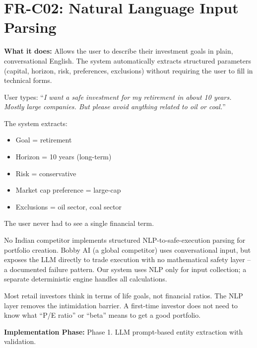 \documentclass[12pt, a4paper, openany, oneside]{report}
\begin{document}
\section{FR-C02: Natural Language Input Parsing}

\textbf{What it does:} Allows the user to describe their investment goals in plain, conversational English. The system automatically extracts structured parameters (capital, horizon, risk, preferences, exclusions) without requiring the user to fill in technical forms.

\begin{examplebox}
User types: ``\textit{I want a safe investment for my retirement in about 10 years. Mostly large companies. But please avoid anything related to oil or coal.}''

The system extracts:
\begin{itemize}[noitemsep]
  \item Goal = retirement
  \item Horizon = 10 years (long-term)
  \item Risk = conservative
  \item Market cap preference = large-cap
  \item Exclusions = oil sector, coal sector
\end{itemize}
The user never had to see a single financial term.
\end{examplebox}

\begin{gapbox}
No Indian competitor implements structured NLP-to-safe-execution parsing for portfolio creation. Bobby AI (a global competitor) uses conversational input, but exposes the LLM directly to trade execution with no mathematical safety layer -- a documented failure pattern. Our system uses NLP only for input collection; a separate deterministic engine handles all calculations.
\end{gapbox}

\begin{valuebox}
Most retail investors think in terms of life goals, not financial ratios. The NLP layer removes the intimidation barrier. A first-time investor does not need to know what ``P/E ratio'' or ``beta'' means to get a good portfolio.
\end{valuebox}

\textbf{Implementation Phase:} Phase 1. LLM prompt-based entity extraction with validation.

\end{document}
